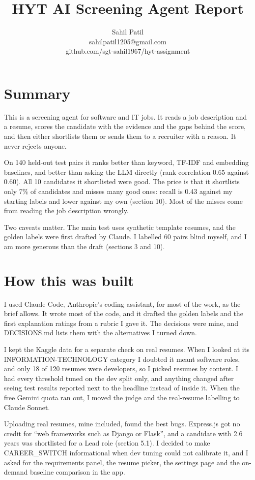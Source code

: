\documentclass[conference]{styles/acmsiggraph}
\title{\huge HYT AI Screening Agent Report}
\author{\Large Sahil Patil \\ sahilpatil1205@gmail.com \\ github.com/sgt-sahil1967/hyt-assignment}
\newcommand{\code}[1]{\textsf{\small #1}}
\begin{document}
\maketitle

\section*{Summary}

This is a screening agent for software and IT jobs. It reads a job description and a resume, scores the candidate with the evidence and the gaps behind the score, and then either shortlists them or sends them to a recruiter with a reason. It never rejects anyone.

On 140 held-out test pairs it ranks better than keyword, TF-IDF and embedding baselines, and better than asking the LLM directly (rank correlation 0.65 against 0.60). All 10 candidates it shortlisted were good. The price is that it shortlists only 7\% of candidates and misses many good ones: recall is 0.43 against my starting labels and lower against my own (section 10). Most of the misses come from reading the job description wrongly.

Two caveats matter. The main test uses synthetic template resumes, and the golden labels were first drafted by Claude. I labelled 60 pairs blind myself, and I am more generous than the draft (sections 3 and 10).

\section*{How this was built}

I used Claude Code, Anthropic's coding assistant, for most of the work, as the brief allows. It wrote most of the code, and it drafted the golden labels and the first explanation ratings from a rubric I gave it. The decisions were mine, and \code{DECISIONS.md} lists them with the alternatives I turned down.

I kept the Kaggle data for a separate check on real resumes. When I looked at its INFORMATION-TECHNOLOGY category I doubted it meant software roles, and only 18 of 120 resumes were developers, so I picked resumes by content. I had every threshold tuned on the dev split only, and anything changed after seeing test results reported next to the headline instead of inside it. When the free Gemini quota ran out, I moved the judge and the real-resume labelling to Claude Sonnet.

Uploading real resumes, mine included, found the best bugs. Express.js got no credit for ``web frameworks such as Django or Flask'', and a candidate with 2.6 years was shortlisted for a Lead role (section 5.1). I decided to make \code{CAREER\_SWITCH} informational when dev tuning could not calibrate it, and I asked for the requirements panel, the resume picker, the settings page and the on-demand baseline comparison in the app.
\end{document}
